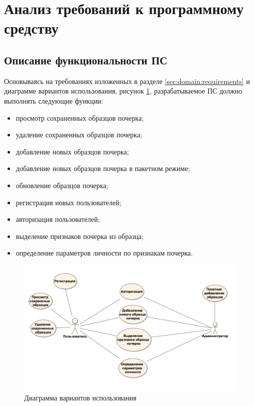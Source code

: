 \section{Анализ требований к программному средству}
\label{sec:freq}
\subsection{Описание функциональности ПС}
Основываясь на требованиях изложенных в разделе \ref{sec:domain:requirements} и диаграмме вариантов использования, рисунок \ref{fig:freg:usecase}, разрабатываемое ПС должно выполнять следующие функции:

\begin{itemize}
  \item просмотр сохраненных образцов почерка;
  \item удаление сохраненных образцов почерка;
  \item добавление новых образцов почерка;
  \item добавление новых образцов почерка в пакетном режиме;
  \item обновление образцов почерка;
  \item регистрация новых пользователей;
  \item авторизация пользователей;
  \item выделение признаков почерка из образца;
  \item определение параметров личности по признакам почерка.
\end{itemize}

\begin{figure}[ht]
\centering
    \includegraphics[scale=0.4]{figures/use_case.png}  
    \caption{Диаграмма вариантов использования}
  \label{fig:freg:usecase}
\end{figure}

